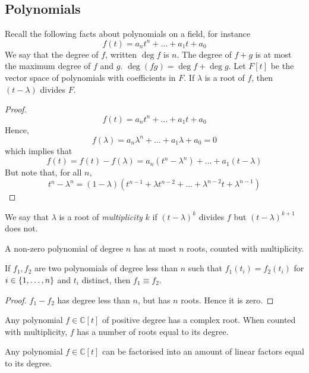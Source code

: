 \subsection{Polynomials}
Recall the following facts about polynomials on a field, for instance
\[
	f(t) = a_n t^n + \dots + a_1 t + a_0
\]
We say that the degree of \( f \), written \( \deg f \) is \( n \).
The degree of \( f + g \) is at most the maximum degree of \( f \) and \( g \).
\( \deg (fg) = \deg f + \deg g \).
Let \( F[t] \) be the vector space of polynomials with coefficients in \( F \).
If \( \lambda \) is a root of \( f \), then \( (t-\lambda) \) divides \( F \).
\begin{proof}
	\[
		f(t) = a_n t^n + \dots + a_1 t + a_0
	\]
	Hence,
	\[
		f(\lambda) = a_n \lambda^n + \dots + a_1 \lambda + a_0 = 0
	\]
	which implies that
	\[
		f(t) = f(t) - f(\lambda) = a_n(t^n - \lambda^n) + \dots + a_1(t - \lambda)
	\]
	But note that, for all \( n \),
	\[
		t^n - \lambda^n = (1-\lambda)(t^{n-1} + \lambda t^{n-2} + \dots + \lambda^{n-2} t + \lambda^{n-1})
	\]
\end{proof}
\begin{remark}
	We say that \( \lambda \) is a root of \textit{multiplicity} \( k \) if \( (t-\lambda)^k \) divides \( f \) but \( (t-\lambda)^{k+1} \) does not.
\end{remark}
\begin{corollary}
	A non-zero polynomial of degree \( n \) has at most \( n \) roots, counted with multiplicity.
\end{corollary}
\begin{corollary}
	If \( f_1, f_2 \) are two polynomials of degree less than \( n \) such that \( f_1(t_i) = f_2(t_i) \) for \( i \in \qty{1, \dots, n} \) and \( t_i \) distinct, then \( f_1 \equiv f_2 \).
\end{corollary}
\begin{proof}
	\( f_1 - f_2 \) has degree less than \( n \), but has \( n \) roots.
	Hence it is zero.
\end{proof}
\begin{theorem}
	Any polynomial \( f \in \mathbb C[t] \) of positive degree has a complex root.
	When counted with multiplicity, \( f \) has a number of roots equal to its degree.
\end{theorem}
\begin{corollary}
	Any polynomial \( f \in \mathbb C[t] \) can be factorised into an amount of linear factors equal to its degree.
\end{corollary}

